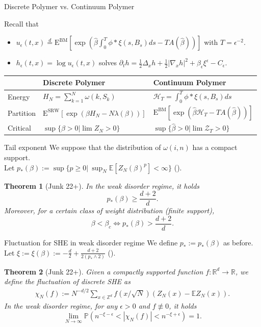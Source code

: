 \documentclass[10pt]{beamer}
\newtheorem{thm}{Theorem}
\newcommand{\R}{\mathbb{R}}
\renewcommand{\P}{\mathbb{P
}}
\newcommand{\E}{\mathbb{E}}
\newcommand{\Z}{\mathbb{Z}}
\newcommand{\e}{\epsilon}
\def\al#1{\begin{align*}#1\end{align*}}
\begin{document}
\begin{frame}{Discrete Polymer vs. Continuum Polymer}

Recall that
\begin{itemize}
    \item $u_\epsilon (t,x) \overset{d}{=}\mathrm{E}^{\text{BM}}\left[\exp\left(\hat{\beta}\int^T_0 \phi \ast \xi(s,B_s)ds  - T A(\hat{\beta})\right)\right]$ with $T=\epsilon^{-2}$.
        \item $h_\epsilon(t,x)=\log{u_\epsilon (t,x)}$ solves $\partial_t h=\frac{1}{2}\Delta_x h+\frac{1}{2}|\nabla_x h|^2+\beta_\epsilon \xi^\epsilon-C_\epsilon$.
\end{itemize}
\renewcommand{\arraystretch}{2.0} %

\begin{table}[h]
\begin{tabular}{| l | l | l |}
    \hline
    \textbf{} & \textbf{Discrete Polymer} & \textbf{Continuum Polymer} \\ \hline
    Energy & $H_N= \sum_{k=1}^N \omega(k,S_k)$ & $\mathcal{H}_T=\int^T_0 \phi \ast \xi(s,B_s)ds$ \\ \hline
    Partition & $\mathrm{E}^{\text{SRW}}\left[\exp\left(\beta H_N-N\lambda(\beta)\right)\right]$ & $\mathrm{E}^{\text{BM}}\left[\exp\left(\hat{\beta}\mathcal{H}_T  - T A(\hat{\beta})\right)\right]$ \\ \hline
    Critical & $\sup\{\beta>0 | \lim Z_N>0\}$ & $\sup\{\hat{\beta}>0 | \lim\mathcal{Z}_T>0\}$ \\ \hline
\end{tabular}
\end{table}

\end{frame}
\begin{frame}{Tail exponent}
 We suppose that the distribution of $\omega(i,n)$ has a compact support.\\
 Let $p_*(\beta):= \sup\{p\geq 0|~ \sup_N\E[Z_N(\beta)^p]<\infty\}$ ({\color{red}{tail exponent}}).
    \begin{thm}[Junk 22+]
         In the weak disorder regime, it holds 
        $$p_*(\beta)\geq \frac{d+2}{d}.$$
        Moreover, for a certain class of weight distribution (finite support), 
        $$\beta<\beta_c\Leftrightarrow p_*(\beta)> \frac{d+2}{d}.$$
    \end{thm}
\end{frame}
\begin{frame}{Fluctuation for SHE in weak disorder regime}
We define $p_*:=p_*(\beta)$ as before.\\
Let $\xi:=\xi(\beta):=- \frac{d}{2}+\frac{d+2}{2(p_*\wedge 2)}$ ({\color{red}{fluctuation exponent}}).
     \begin{thm}[Junk 22+]
     Given a compactly supported function $f:\R^d\to \R$, we define the fluctuation of discrete SHE as
     \al{
     \chi_N(f):= N^{-d/2}\sum_{x\in \Z^d}f(x/\sqrt{N}) (Z_N(x)-\E Z_N(x)).
     }
       In the weak disorder regime, for any $\e>0$ and $f\not\equiv 0$, it holds
        $$\lim_{N\to\infty}\P( n^{-\xi-\e}<|\chi_N(f)|< n^{-\xi+\e})= 1 .$$
    \end{thm}
\end{frame}
\end{document}
